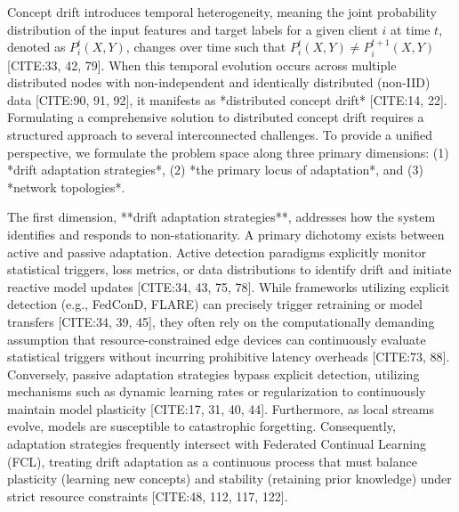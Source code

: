 \documentclass[journal]{IEEEtran}
\begin{document}
Concept drift introduces temporal heterogeneity, meaning the joint probability distribution of the input features and target labels for a given client $i$ at time $t$, denoted as $P_i^t(X, Y)$, changes over time such that $P_i^t(X, Y) \neq P_i^{t+1}(X, Y)$ [CITE:33, 42, 79]. When this temporal evolution occurs across multiple distributed nodes with non-independent and identically distributed (non-IID) data [CITE:90, 91, 92], it manifests as *distributed concept drift* [CITE:14, 22]. Formulating a comprehensive solution to distributed concept drift requires a structured approach to several interconnected challenges. To provide a unified perspective, we formulate the problem space along three primary dimensions: (1) *drift adaptation strategies*, (2) *the primary locus of adaptation*, and (3) *network topologies*.

The first dimension, **drift adaptation strategies**, addresses how the system identifies and responds to non-stationarity. A primary dichotomy exists between active and passive adaptation. Active detection paradigms explicitly monitor statistical triggers, loss metrics, or data distributions to identify drift and initiate reactive model updates [CITE:34, 43, 75, 78]. While frameworks utilizing explicit detection (e.g., FedConD, FLARE) can precisely trigger retraining or model transfers [CITE:34, 39, 45], they often rely on the computationally demanding assumption that resource-constrained edge devices can continuously evaluate statistical triggers without incurring prohibitive latency overheads [CITE:73, 88]. Conversely, passive adaptation strategies bypass explicit detection, utilizing mechanisms such as dynamic learning rates or regularization to continuously maintain model plasticity [CITE:17, 31, 40, 44]. Furthermore, as local streams evolve, models are susceptible to catastrophic forgetting. Consequently, adaptation strategies frequently intersect with Federated Continual Learning (FCL), treating drift adaptation as a continuous process that must balance plasticity (learning new concepts) and stability (retaining prior knowledge) under strict resource constraints [CITE:48, 112, 117, 122].
\end{document}
